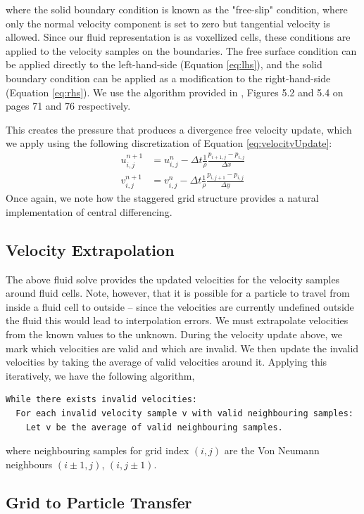 \documentclass[sigconf]{acmart}
\begin{document}
where the solid boundary condition is known as the "free-slip" condition, where only the normal velocity component is set to zero but tangential velocity is allowed. Since our fluid representation is as voxellized cells, these conditions are applied to the velocity samples on the boundaries. The free surface condition can be applied directly to the left-hand-side (Equation \ref{eq:lhs}), and the solid boundary condition can be applied as a modification to the right-hand-side (Equation \ref{eq:rhs}). We use the algorithm provided in \cite{bridson2015}, Figures 5.2 and 5.4 on pages 71 and 76 respectively.

This creates the pressure that produces a divergence free velocity update, which we apply using the following discretization of Equation \ref{eq:velocityUpdate}:
\begin{align}
  u_{i,j}^{n+1} &= u_{i,j}^n - \Delta{}t\frac{1}{\rho}\frac{p_{i+1,j} - p_{i,j}}{\Delta{}x} \\
  v_{i,j}^{n+1} &= v_{i,j}^n - \Delta{}t\frac{1}{\rho}\frac{p_{i,j+1} - p_{i,j}}{\Delta{}y}
\end{align}
Once again, we note how the staggered grid structure provides a natural implementation of central differencing.

\subsection{Velocity Extrapolation}

The above fluid solve provides the updated velocities for the velocity samples around fluid cells. Note, however, that it is possible for a particle to travel from inside a fluid cell to outside -- since the velocities are currently undefined outside the fluid this would lead to interpolation errors. We must extrapolate velocities from the known values to the unknown. During the velocity update above, we mark which velocities are valid and which are invalid. We then update the invalid velocities by taking the average of valid velocities around it. Applying this iteratively, we have the following algorithm,
\begin{lstlisting}[style=myStyle]
While there exists invalid velocities:
  For each invalid velocity sample v with valid neighbouring samples:
    Let v be the average of valid neighbouring samples.
\end{lstlisting}
where neighbouring samples for grid index $(i,j)$ are the Von Neumann neighbours $(i\pm{}1,j)$, $(i,j\pm{}1)$.

\subsection{Grid to Particle Transfer}
\end{document}
